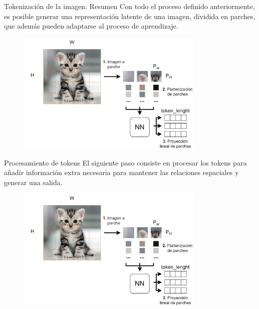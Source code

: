\begin{frame}{Tokenización de la imagen: Resumen}
Con todo el proceso definido anteriormente, es posible generar una \alert{representación latente} de una imagen, dividida en parches, que además pueden adaptarse al proceso de \alert{aprendizaje}. 

\begin{figure}
    \centering
    \includegraphics[width=0.8\textwidth]{Slides/figures/Vision_Transformers/Image_Tokenization_Process.png}
\end{figure}
\end{frame}

\begin{frame}{Procesamiento de tokens}
El siguiente paso consiste en procesar los tokens para añadir \alert{información extra} necesaria para mantener las relaciones espaciales y generar una salida.

\begin{figure}
    \centering
    \includegraphics[width=0.8\textwidth]{Slides/figures/Vision_Transformers/Image_Tokenization_Process.png}
\end{figure}
\end{frame}


